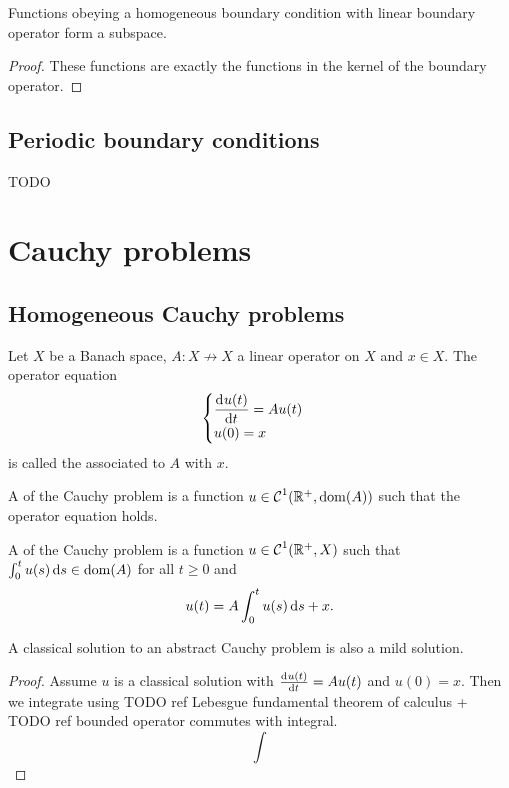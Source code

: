 \begin{lemma}
Functions obeying a homogeneous boundary condition with linear boundary operator form a subspace.
\end{lemma}
\begin{proof}
These functions are exactly the functions in the kernel of the boundary operator.
\end{proof}

\subsection{Periodic boundary conditions}
TODO

\section{Cauchy problems}
\subsection{Homogeneous Cauchy problems}
\begin{definition}
Let $X$ be a Banach space, $A: X\not\to X$ a linear operator on $X$ and $x\in X$. The operator equation
\[ \begin{cases}
\mathinner{ \dfrac{\operatorname{d \!}{^{}}u(t)}{\operatorname{d \!}{{t}^{}}} } = Au(t) \\ u(0) = x
\end{cases} \]
is called the  associated to $A$ with  $x$.

A  of the Cauchy problem is a function $u\in \operatorname{\mathcal{C}}^1(\mathbb{R}^+, \operatorname{dom}(A))$ such that the operator equation holds.

A  of the Cauchy problem is a function $u\in \operatorname{\mathcal{C}}^1(\mathbb{R}^+, X)$ such that $\int_0^tu(s)\operatorname{d \!}{s} \in \operatorname{dom}(A)$ for all $t\geq 0$ and
\[ u(t) = A\int_0^tu(s)\operatorname{d \!}{s} + x. \]
\end{definition}

\begin{lemma}
A classical solution to an abstract Cauchy problem is also a mild solution.
\end{lemma}
\begin{proof}
Assume $u$ is a classical solution with $\od{u(t)}{t} = Au(t)$ and $u(0) = x$. Then we integrate using TODO ref Lebesgue fundamental theorem of calculus + TODO ref bounded operator commutes with integral.
\[ \int \]
\end{proof}


